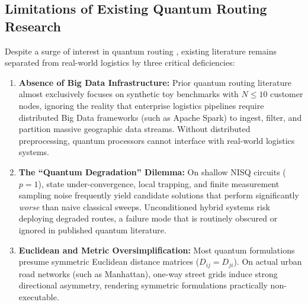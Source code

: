 \documentclass[journal,10pt]{IEEEtran}
\begin{document}
\subsection{Limitations of Existing Quantum Routing Research}
Despite a surge of interest in quantum routing \cite{azad2022solving, borowski2020new, feld2019hybrid, harwood2021formulating}, existing literature remains separated from real-world logistics by three critical deficiencies:
\begin{enumerate}
    \item \textbf{Absence of Big Data Infrastructure:} Prior quantum routing literature almost exclusively focuses on synthetic toy benchmarks with $N \le 10$ customer nodes, ignoring the reality that enterprise logistics pipelines require distributed Big Data frameworks (such as Apache Spark) to ingest, filter, and partition massive geographic data streams. Without distributed preprocessing, quantum processors cannot interface with real-world logistics systems.
    \item \textbf{The ``Quantum Degradation'' Dilemma:} On shallow NISQ circuits ($p=1$), state under-convergence, local trapping, and finite measurement sampling noise frequently yield candidate solutions that perform significantly \textit{worse} than naive classical sweeps. Unconditioned hybrid systems risk deploying degraded routes, a failure mode that is routinely obscured or ignored in published quantum literature.
    \item \textbf{Euclidean and Metric Oversimplification:} Most quantum formulations presume symmetric Euclidean distance matrices ($D_{ij} = D_{ji}$). On actual urban road networks (such as Manhattan), one-way street grids induce strong directional asymmetry, rendering symmetric formulations practically non-executable.
\end{enumerate}
\end{document}

